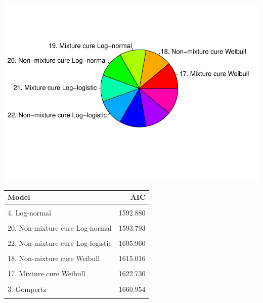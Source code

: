 \documentclass[
]{article}
\begin{document}
\begin{flushleft}\includegraphics{Images/cure-1} \end{flushleft}

\begin{table}
\centering
\begin{tabular}{lr}
\toprule
Model & AIC\\
\midrule
\cellcolor{gray!6}{7. Generalised Gamma} & \cellcolor{gray!6}{1589.049}\\
4. Log-normal & 1592.880\\
\cellcolor{gray!6}{19. Mixture cure Log-normal} & \cellcolor{gray!6}{1593.762}\\
20. Non-mixture cure Log-normal & 1593.793\\
\cellcolor{gray!6}{21. Mixture cure Log-logistic} & \cellcolor{gray!6}{1604.290}\\
22. Non-mixture cure Log-logistic & 1605.960\\
\cellcolor{gray!6}{5. Log-logistic} & \cellcolor{gray!6}{1609.294}\\
18. Non-mixture cure Weibull & 1615.016\\
\cellcolor{gray!6}{6. Gamma} & \cellcolor{gray!6}{1621.982}\\
17. Mixture cure Weibull & 1622.730\\
\cellcolor{gray!6}{2. Weibull} & \cellcolor{gray!6}{1632.618}\\
3. Gompertz & 1660.954\\
\cellcolor{gray!6}{1. Exponential} & \cellcolor{gray!6}{1668.212}\\
\bottomrule
\end{tabular}
\end{table}
\end{document}
